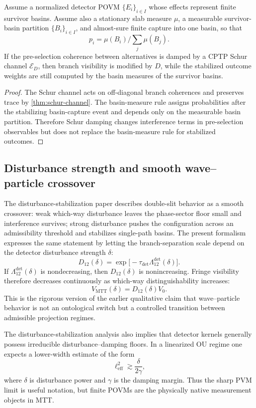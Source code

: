 \documentclass[11pt]{article}
\newcommand{\calE}{\mathcal E}
\newcommand{\MTT}{\mathrm{MTT}}
\begin{document}
\begin{proposition}
Assume a normalized detector POVM \(\{E_i\}_{i\in I}\) whose effects represent finite
survivor basins. Assume also a stationary slab measure \(\mu\), a measurable survivor-basin
partition \(\{B_i\}_{i\in I}\), and almost-sure finite capture into one basin, so that
\[
  p_i=\mu(B_i)/\sum_j\mu(B_j).
\]
If the pre-selection coherence between alternatives is damped by a CPTP Schur channel
\(\calE_D\), then branch visibility is modified by \(D\), while the stabilized outcome
weights are still computed by the basin measures of the survivor basins.
\end{proposition}

\begin{proof}
The Schur channel acts on off-diagonal branch coherences and preserves trace by
\cref{thm:schur-channel}. The basin-measure rule assigns probabilities after the
stabilizing basin-capture event and depends only on the measurable basin partition.
Therefore Schur damping changes interference terms in pre-selection observables but does
not replace the basin-measure rule for stabilized outcomes.
\end{proof}

\subsection{Disturbance strength and smooth wave--particle crossover}

The disturbance-stabilization paper describes double-slit behavior as a smooth crossover:
weak which-way disturbance leaves the phase-sector floor small and interference survives;
strong disturbance pushes the configuration across an admissibility threshold and stabilizes
single-path basins. The present formalism expresses the same statement by letting the
branch-separation scale depend on the detector disturbance strength \(\delta\):
\[
  D_{12}(\delta)
  =
  \exp\bigl[-\tau_{\mathrm{det}}\Lambda_{12}^{\mathrm{det}}(\delta)\bigr].
\]
If \(\Lambda_{12}^{\mathrm{det}}(\delta)\) is nondecreasing, then \(D_{12}(\delta)\) is
nonincreasing. Fringe visibility therefore decreases continuously as which-way
distinguishability increases:
\[
  V_{\MTT}(\delta)
  =
  D_{12}(\delta)V_0.
\]
This is the rigorous version of the earlier qualitative claim that wave--particle behavior is
not an ontological switch but a controlled transition between admissible projection regimes.

\begin{remark}
The disturbance-stabilization analysis also implies that detector kernels generally possess
irreducible disturbance--damping floors. In a linearized OU regime one expects a lower-width
estimate of the form
\[
  \ell_{\mathrm{eff}}^2\gtrsim \frac{\delta}{2\gamma},
\]
where \(\delta\) is disturbance power and \(\gamma\) is the damping margin. Thus the sharp
PVM limit is useful notation, but finite POVMs are the physically native measurement
objects in MTT.
\end{remark}
\end{document}
